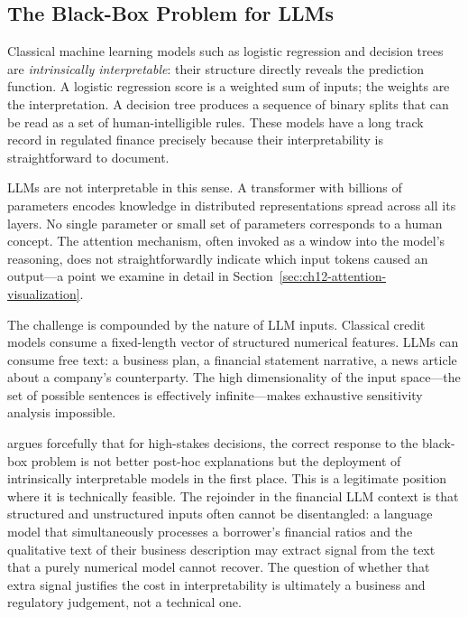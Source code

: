 \subsection{The Black-Box Problem for LLMs}
\label{sec:ch12-black-box-problem}

Classical machine learning models such as logistic regression and decision trees are
\emph{intrinsically interpretable}: their structure directly reveals the prediction
function. A logistic regression score is a weighted sum of inputs; the weights are the
interpretation. A decision tree produces a sequence of binary splits that can be read
as a set of human-intelligible rules. These models have a long track record in regulated
finance precisely because their interpretability is straightforward to document.

LLMs are not interpretable in this sense. A transformer with billions of parameters
encodes knowledge in distributed representations spread across all its layers. No single
parameter or small set of parameters corresponds to a human concept. The attention
mechanism, often invoked as a window into the model's reasoning, does not straightforwardly
indicate which input tokens caused an output---a point we examine in detail in
Section~\ref{sec:ch12-attention-visualization}.

The challenge is compounded by the nature of LLM inputs. Classical credit models consume
a fixed-length vector of structured numerical features. LLMs can consume free text: a
business plan, a financial statement narrative, a news article about a company's
counterparty. The high dimensionality of the input space---the set of possible sentences
is effectively infinite---makes exhaustive sensitivity analysis impossible.

\begin{remark}
\citet{rudin2019stop} argues forcefully that for high-stakes decisions, the correct
response to the black-box problem is not better post-hoc explanations but the deployment
of intrinsically interpretable models in the first place. This is a legitimate position
where it is technically feasible. The rejoinder in the financial LLM context is that
structured and unstructured inputs often cannot be disentangled: a language model that
simultaneously processes a borrower's financial ratios and the qualitative text of their
business description may extract signal from the text that a purely numerical model
cannot recover. The question of whether that extra signal justifies the cost in
interpretability is ultimately a business and regulatory judgement, not a technical one.
\end{remark}

